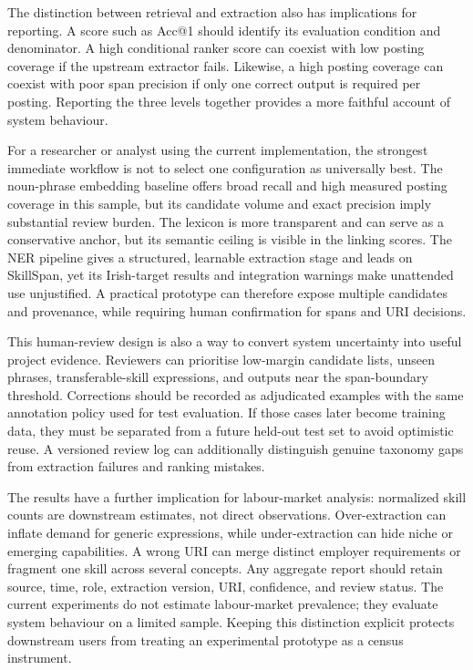 \documentclass[conference]{IEEEtran}
\begin{document}
The distinction between retrieval and extraction also has implications for reporting. A score such as Acc@1 should identify its evaluation condition and denominator. A high conditional ranker score can coexist with low posting coverage if the upstream extractor fails. Likewise, a high posting coverage can coexist with poor span precision if only one correct output is required per posting. Reporting the three levels together provides a more faithful account of system behaviour.

For a researcher or analyst using the current implementation, the strongest immediate workflow is not to select one configuration as universally best. The noun-phrase embedding baseline offers broad recall and high measured posting coverage in this sample, but its candidate volume and exact precision imply substantial review burden. The lexicon is more transparent and can serve as a conservative anchor, but its semantic ceiling is visible in the linking scores. The NER pipeline gives a structured, learnable extraction stage and leads on SkillSpan, yet its Irish-target results and integration warnings make unattended use unjustified. A practical prototype can therefore expose multiple candidates and provenance, while requiring human confirmation for spans and URI decisions.

This human-review design is also a way to convert system uncertainty into useful project evidence. Reviewers can prioritise low-margin candidate lists, unseen phrases, transferable-skill expressions, and outputs near the span-boundary threshold. Corrections should be recorded as adjudicated examples with the same annotation policy used for test evaluation. If those cases later become training data, they must be separated from a future held-out test set to avoid optimistic reuse. A versioned review log can additionally distinguish genuine taxonomy gaps from extraction failures and ranking mistakes.

The results have a further implication for labour-market analysis: normalized skill counts are downstream estimates, not direct observations. Over-extraction can inflate demand for generic expressions, while under-extraction can hide niche or emerging capabilities. A wrong URI can merge distinct employer requirements or fragment one skill across several concepts. Any aggregate report should retain source, time, role, extraction version, URI, confidence, and review status. The current experiments do not estimate labour-market prevalence; they evaluate system behaviour on a limited sample. Keeping this distinction explicit protects downstream users from treating an experimental prototype as a census instrument.
\end{document}
